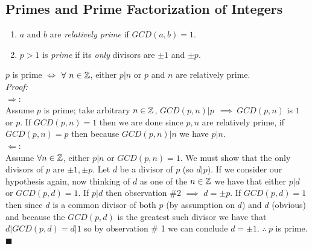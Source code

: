 \subsection{Primes and Prime Factorization of Integers}
\begin{definition}
\begin{enumerate}
    \item $a$ and $b$ are \textit{relatively prime} if $GCD(a,b)=1$.
    \item $p>1$ is \textit{prime} if its \textit{only} divisors are $\pm 1$ and $\pm p$.
\end{enumerate}
\end{definition}
\begin{proposition} 
$p$ is prime $\iff$ $\forall \ n \in {\mathbb{ Z}} $, either $p|n$ or $p$ and $n$ are relatively prime.\\
\textit{Proof:} \\
\textbf{$\Rightarrow :$}\\
Assume $p$ is prime; take arbitrary $n\in{\mathbb{ Z}}$, $GCD(p,n)|p\ \ \implies \ GCD(p,n)$ is $1$ or $p$. If $GCD(p,n)=1$ then we are done since $p,n$ are relatively prime, if $GCD(p,n)=p$ then because $GCD(p,n)|n$ we have $p|n$.\steezybreak\\
\textbf{$\Leftarrow :$}\\
Assume $\forall n \in {\mathbb{ Z}}$, either $p|n$ or $GCD(p,n)=1$. We must show that the only divisors of $p$ are $\pm 1, \pm p$. Let $d$ be a divisor of $p$ (so $d|p$). If we consider our hypothesis again, now thinking of $d$ as one of the $n\in{\mathbb{ Z}}$ we have that either $p|d$ or $GCD(p,d)=1$. If $p|d$ then observation \#2 $\implies$ $d=\pm p$. If $GCD(p,d)=1$ then since $d$ is a common divisor of both $p$ (by assumption on $d$) and $d$ (obvious) and because the $GCD(p,d)$ is the greatest such divisor we have that $d|GCD(p,d)=d|1$ so by observation \# 1 we can conclude $d=\pm 1$. $\therefore \ p$ is prime. $\blacksquare$
\end{proposition}
